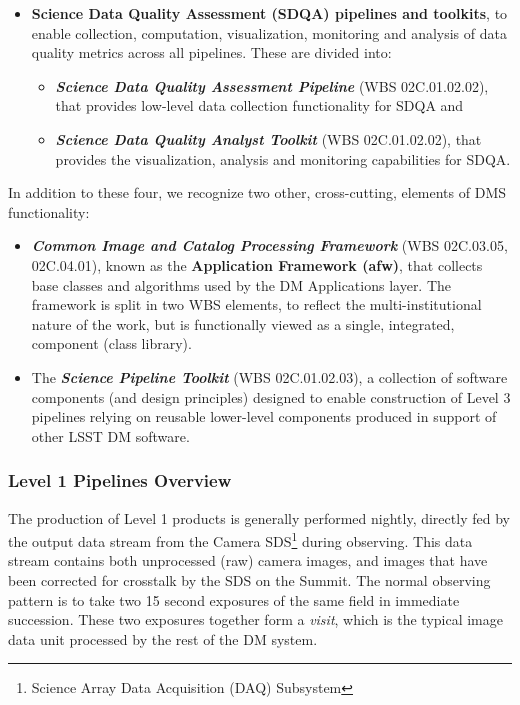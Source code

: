 \documentclass[12pt]{article}
\newcommand{\wbsSDQAP}{WBS 02C.01.02.02}
\newcommand{\wbsSDQAT}{WBS 02C.01.02.02}
\newcommand{\wbsSPT}{WBS 02C.01.02.03}
\newcommand{\wbsAFW}{WBS 02C.03.05, 02C.04.01}
\begin{document}
\begin{itemize}
       \item {\bf Science Data Quality Assessment (SDQA) pipelines and toolkits}, to enable collection, computation, visualization, monitoring and analysis of data quality metrics across all pipelines. These are divided into:
       \begin{itemize}
           \item {\bf \emph{Science Data Quality Assessment Pipeline}} (\wbsSDQAP), that provides low-level data collection functionality for SDQA and
           \item {\bf \emph{Science Data Quality Analyst Toolkit}} (\wbsSDQAT), that provides the visualization, analysis and monitoring capabilities for SDQA.
       \end{itemize}

\end{itemize}

In addition to these four, we recognize two other, cross-cutting, elements of DMS functionality:

\begin{itemize}
       \item {\bf \emph{Common Image and Catalog Processing Framework}} (\wbsAFW), known as the {\bf Application Framework (afw)}, that collects base classes and algorithms %
         used by the DM Applications layer. The framework is split in two WBS elements, to reflect the multi-institutional nature of the work, but is functionally viewed as a single, integrated, component (class library).
       \item The {\bf \emph{Science Pipeline Toolkit}} (\wbsSPT), a collection of software components (and design principles) designed to enable construction of Level 3 pipelines relying on reusable lower-level components produced in support of other LSST DM software.
\end{itemize}

\subsubsection{Level 1 Pipelines Overview}
The production of Level 1 products is generally performed nightly, directly fed by 
the output data stream from the Camera SDS\footnote{Science Array Data Acquisition (DAQ) Subsystem} during observing. This data stream
contains both unprocessed (raw) camera images, and images that have been corrected
for crosstalk by the SDS on the Summit.  The normal observing
pattern is to take two 15 second exposures of the same field in immediate
succession.  These two exposures together form a {\em visit}, which is the typical
image data unit processed by the rest of the DM system.
\\
\end{document}
